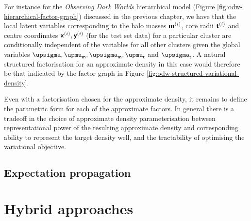 For instance for the \emph{Observing Dark Worlds} hierarchical model (Figure \ref{fig:odw-hierarchical-factor-graph}) discussed in the previous chapter, we have that the local latent variables corresponding to the halo masses $\boldsymbol{\mathsf{m}}^{(i)}$, core radii $\boldsymbol{\mathsf{t}}^{(i)}$ and centre coordinates $\boldsymbol{\mathsf{x}}^{(i)}, \boldsymbol{\mathsf{y}}^{(i)}$ (for the test set data) for a particular cluster are conditionally independent of the variables for all other clusters given the global variables $\upsigma,\upmu_{\rvar{m}},\upsigma_{\rvar{m}},\upmu_{\rvar{t}}$ and $\upsigma_{\rvar{t}}$. A natural structured factorisation for an approximate density in this case would therefore be that indicated by the factor graph in Figure \ref{fig:odw-structured-variational-density}.

Even with a factorisation chosen for the approximate density, it remains to define the parametric form for each of the approximate factors. In general there is a tradeoff in the choice of approximate density parameterisation between representational power of the resulting approximate density and corresponding ability to represent the target density well, and the tractability of optimising the variational objective.

 


\subsection{Expectation propagation}


\section{Hybrid approaches}

